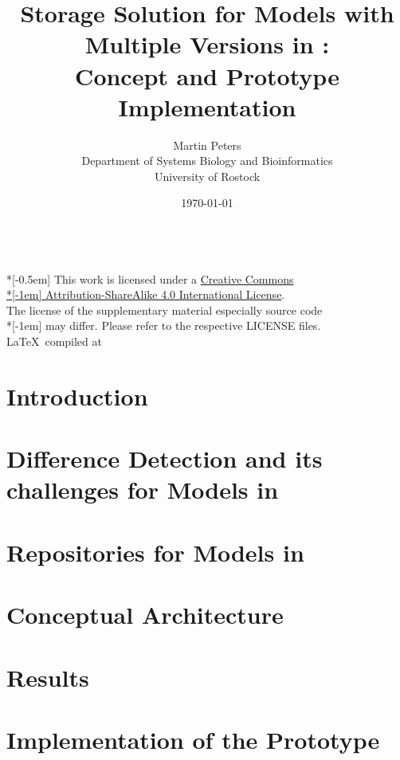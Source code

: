\documentclass[12pt, a4paper, titlepage]{book}
\title{Storage Solution for Models with Multiple Versions in \sysbio:\\ Concept and Prototype Implementation}
\author{Martin Peters\\[24pt]
	\small Department of Systems Biology and Bioinformatics\\[-3pt]
	\small University of Rostock}
\date{\today}
\begin{document}
	\maketitle
	\pagebreak
	~ \vfill
	{
		\tiny \noindent
		{\normalsize \href{http://creativecommons.org/licenses/by-sa/4.0/}{\ccbysa}} \\*[-0.5em]
		This work is licensed under a \href{http://creativecommons.org/licenses/by-sa/4.0/}{Creative Commons\\*[-1em] Attribution-ShareAlike 4.0 International License}. \\
		The license of the supplementary material especially source code\\*[-1em]
		may differ. Please refer to the respective LICENSE files.\\
		\LaTeX ~compiled at \DTMnow
	}
	\pagebreak
	\tableofcontents
	\listoffigures
	
	\chapter{Introduction}
	
	
	\chapter{Difference Detection and its challenges for Models in \sysbio}
	
	
	\chapter{Repositories for Models in \sysbio}
	
	
	\chapter{Conceptual Architecture}
	
	
	\chapter{Results}
	
	
	\chapter{Implementation of the Prototype}
	
	
\end{document}

